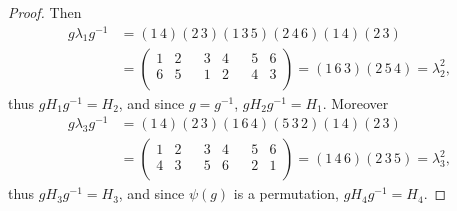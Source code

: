 \documentclass[11pt,a4paper]{article}
\begin{document}
\begin{proof}
Then 
\begin{align*}
g \lambda_1 g^{-1} &= (1\,4)(2\,3)(1\,3\,5)(2\,4\,6)(1\,4)(2\,3)\\
&=
\left(
\begin{array}{cccccccc}
1 & 2 & & 3 & 4 & & 5 & 6\\
 6&5&&1&2&&4&3 \\
\end{array}
\right) = (1\,6\,3)(2\,5\,4) = \lambda_2^2,
\end{align*}
thus $gH_1g^{-1} = H_2$, and since $g = g^{-1}$, $g H_2 g^{-1} = H_1$.
Moreover
\begin{align*}
g \lambda_3g^{-1} &=(1\,4)(2\,3)(1\,6\,4)(5\,3\,2)(1\,4)(2\,3)\\
&= 
\left(
\begin{array}{cccccccc}
1 & 2 & & 3 & 4 & & 5 & 6\\
 4&3&&5&6&&2&1 \\
  \end{array}
  \right)
 =(1\,4\,6)(2\,3\,5)
 =\lambda_3^2,
\end{align*}
thus $gH_3g^{-1} = H_3$, and since $\psi(g)$ is a permutation, $gH_4 g^{-1} = H_4$.


\end{proof}
\end{document}
